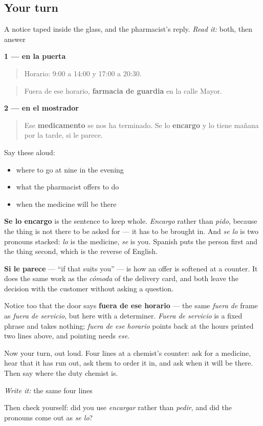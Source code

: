 \subsection*{Your turn}
A notice taped inside the glass, and the pharmacist's reply. \emph{Read it:} both, then answer

\textbf{1 — en la puerta}

\begin{quote}
Horario: 9:00 a 14:00 y 17:00 a 20:30.
\end{quote}

\begin{quote}
Fuera de ese horario, \textbf{farmacia de guardia} en la calle Mayor.
\end{quote}

\textbf{2 — en el mostrador}

\begin{quote}
Ese \textbf{medicamento} se nos ha terminado. Se lo \textbf{encargo} y lo tiene mañana por la tarde, si le parece.
\end{quote}

Say these aloud:

\begin{itemize}
\raggedright
  \item where to go at nine in the evening
  \item what the pharmacist offers to do
  \item when the medicine will be there
\end{itemize}

\begin{culture}
\textbf{Se lo encargo} is the sentence to keep whole. \emph{Encargo} rather than \emph{pido}, because the thing is not there to be asked for — it has to be brought in. And \emph{se lo} is two pronouns stacked: \emph{lo} is the medicine, \emph{se} is you. Spanish puts the person first and the thing second, which is the reverse of English.

\textbf{Si le parece} — \textquotedblleft{}if that suits you\textquotedblright{} — is how an offer is softened at a counter. It does the same work as the \emph{cómoda} of the delivery card, and both leave the decision with the customer without asking a question.

Notice too that the door says \textbf{fuera de ese horario} — the same \emph{fuera de} frame as \emph{fuera de servicio}, but here with a determiner. \emph{Fuera de servicio} is a fixed phrase and takes nothing; \emph{fuera de ese horario} points back at the hours printed two lines above, and pointing needs \emph{ese}.
\end{culture}

\begin{tcolorbox}[breakable,colback=teal!4,colframe=teal!35!black,title={Before you move on}]
Now your turn, out loud. Four lines at a chemist's counter: ask for a medicine, hear that it has run out, ask them to order it in, and ask when it will be there. Then say where the duty chemist is.

\emph{Write it:} the same four lines

Then check yourself: did you use \emph{encargar} rather than \emph{pedir}, and did the pronouns come out as \emph{se lo}?
\end{tcolorbox}
